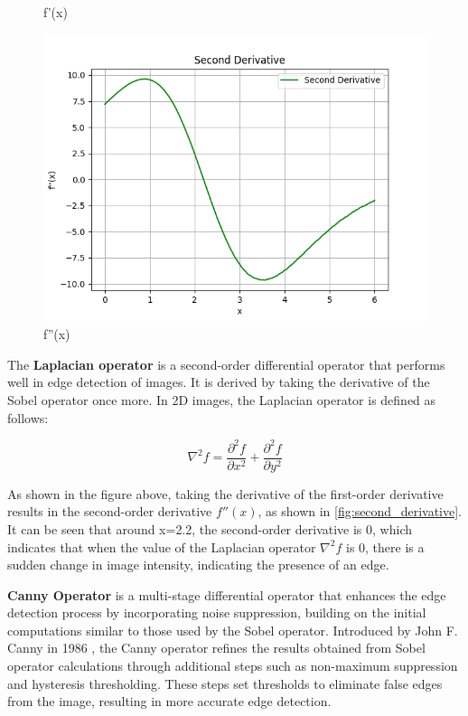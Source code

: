 \begin{figure}[htbp]
\begin{minipage}[b]{0.32\textwidth}
        \caption{f'(x)}
        \label{fig:first_derivative}
    \end{minipage}
    \begin{minipage}[b]{0.32\textwidth}
        \centering
        \includegraphics[width=\textwidth]{./fig/second_derivative.png}
        \caption{f''(x)}
        \label{fig:second_derivative}
    \end{minipage}
\end{figure}

The \textbf{Laplacian operator} is a second-order differential operator that performs well in edge detection of images. It is derived by taking the derivative of the Sobel operator once more. In 2D images, the Laplacian operator is defined as follows: 

\begin{equation} 
    \nabla^2 f = \frac{\partial^2 f}{\partial x^2} + \frac{\partial^2 f}{\partial y^2} 
\end{equation} 

As shown in the figure above, taking the derivative of the first-order derivative results in the second-order derivative $f''(x)$, as shown in \autoref{fig:second_derivative}. It can be seen that around x=2.2, the second-order derivative is 0, which indicates that when the value of the Laplacian operator $\nabla^2 f$ is 0, there is a sudden change in image intensity, indicating the presence of an edge.

\textbf{Canny Operator} is a multi-stage differential operator that enhances the edge detection process by incorporating noise suppression, building on the initial computations similar to those used by the Sobel operator. Introduced by John F. Canny in 1986 \cite{3.2}, the Canny operator refines the results obtained from Sobel operator calculations through additional steps such as non-maximum suppression and hysteresis thresholding. These steps set thresholds to eliminate false edges from the image, resulting in more accurate edge detection.

